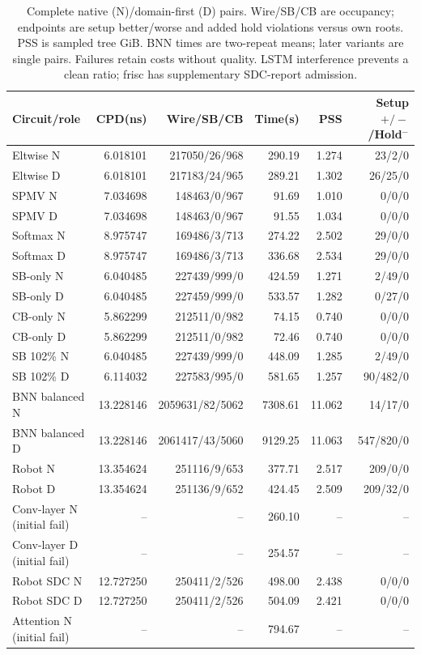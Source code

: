 \documentclass[conference,10pt]{IEEEtran}
\begin{document}
\begin{table}[t]
\centering\footnotesize\setlength{\tabcolsep}{3pt}
\caption{Complete native (N)/domain-first (D) pairs. Wire/SB/CB are occupancy; endpoints are setup better/worse and added hold violations versus own roots. PSS is sampled tree GiB. BNN times are two-repeat means; later variants are single pairs. Failures retain costs without quality. LSTM interference prevents a clean ratio; frisc has supplementary SDC-report admission.}
\label{tab:completecost}
\begin{tabular}{lrrrrr}\hline
Circuit/role & CPD(ns) & Wire/SB/CB & Time(s) & PSS & Setup $+/-$/Hold$^-$\\\hline
Eltwise N&6.018101&217050/26/968&290.19&1.274&23/2/0\\
Eltwise D&6.018101&217183/24/965&289.21&1.302&26/25/0\\
SPMV N&7.034698&148463/0/967&91.69&1.010&0/0/0\\
SPMV D&7.034698&148463/0/967&91.55&1.034&0/0/0\\
Softmax N&8.975747&169486/3/713&274.22&2.502&29/0/0\\
Softmax D&8.975747&169486/3/713&336.68&2.534&29/0/0\\
SB-only N&6.040485&227439/999/0&424.59&1.271&2/49/0\\
SB-only D&6.040485&227459/999/0&533.57&1.282&0/27/0\\
CB-only N&5.862299&212511/0/982&74.15&0.740&0/0/0\\
CB-only D&5.862299&212511/0/982&72.46&0.740&0/0/0\\
SB 102\% N&6.040485&227439/999/0&448.09&1.285&2/49/0\\
SB 102\% D&6.114032&227583/995/0&581.65&1.257&90/482/0\\
BNN balanced N&13.228146&2059631/82/5062&7308.61&11.062&14/17/0\\
BNN balanced D&13.228146&2061417/43/5060&9129.25&11.063&547/820/0\\
Robot N&13.354624&251116/9/653&377.71&2.517&209/0/0\\
Robot D&13.354624&251136/9/652&424.45&2.509&209/32/0\\
Conv-layer N (initial fail)&--&--&260.10&--&--\\
Conv-layer D (initial fail)&--&--&254.57&--&--\\
Robot SDC N&12.727250&250411/2/526&498.00&2.438&0/0/0\\
Robot SDC D&12.727250&250411/2/526&504.09&2.421&0/0/0\\
Attention N (initial fail)&--&--&794.67&--&--\\

\end{tabular}
\end{table}
\end{document}
